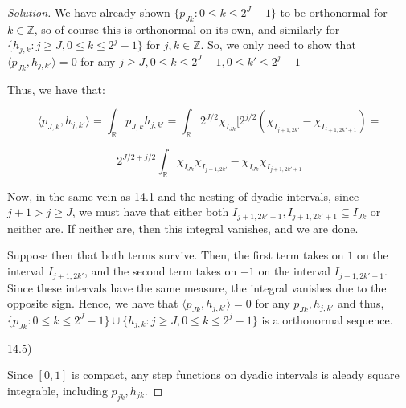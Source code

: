 \documentclass[10pt]{article}
\begin{document}
\begin{proof}[Solution]
We have already shown $\{ p_{Jk} : 0 \leq k \leq 2^J - 1 \}$ to be orthonormal for $k \in \mathbb{Z}$, so of course this is orthonormal on its own, and similarly for $\{ h_{j,k} : j \geq J, 0 \leq k \leq 2^j - 1 \}$ for $j,k \in \mathbb{Z}$. So, we only need to show that $\langle p_{Jk}, h_{j, k'} \rangle = 0$ for any $j \geq J, 0 \leq k \leq 2^J - 1, 0 \leq k' \leq 2^j - 1 $

Thus, we have that:

$$\langle  p_{J,k}, h_{j, k'} \rangle = \int_{\mathbb{R}}p_{J,k} h_{j, k'} = \int_{\mathbb{R}} 2^{J/2} \chi_{I_{Jk}}[ 2^{j/2} (\chi_{I_{j+1, 2k'}} - \chi_{I_{j+1, 2k'+1}} ) = $$

$$ 2^{J/2 + j/2} \int_{\mathbb{R}}  \chi_{I_{Jk}} \chi_{I_{j+1, 2k'}} -  \chi_{I_{Jk}} \chi_{I_{j+1, 2k' + 1}} $$

Now, in the same vein as 14.1 and the nesting of dyadic intervals, since $j+1 > j \geq J$, we must have that either both $I_{j+1, 2k' + 1}, I_{j+1, 2k' + 1} \subseteq I_{Jk}$ or neither are. If neither are, then this integral vanishes, and we are done.

Suppose then that both terms survive. Then, the first term takes on $1$ on the interval $ I_{j+1, 2k'}$, and the second term takes on $-1$ on the interval $I_{j+1, 2k' + 1}$. Since these intervals have the same measure, the integral vanishes due to the opposite sign. Hence, we have that $\langle p_{Jk}, h_{j, k'} \rangle = 0$ for any $p_{Jk}, h_{j, k'}$ and thus, $\{ p_{Jk} : 0 \leq k \leq 2^J - 1 \} \cup \{ h_{j,k} : j \geq J, 0 \leq k \leq 2^j - 1 \}$ is a orthonormal sequence.

14.5)

Since $[0,1]$ is compact, any step functions on dyadic intervals is aleady square integrable, including $p_{jk}, h_{jk}$. 




\end{proof}
\end{document}
